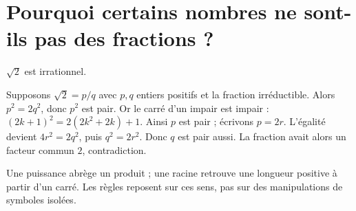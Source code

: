 \documentclass[../cours_3e.tex]{subfiles}
\begin{document}
\section{Pourquoi certains nombres ne sont-ils pas des fractions ?}
\approfondissement
\begin{theoreme}
$\sqrt2$ est irrationnel.
\end{theoreme}
\begin{demonstration}
Supposons $\sqrt2=p/q$ avec $p,q$ entiers positifs et la fraction irréductible. Alors $p^2=2q^2$, donc $p^2$ est pair. Or le carré d'un impair est impair : $(2k+1)^2=2(2k^2+2k)+1$. Ainsi $p$ est pair ; écrivons $p=2r$. L'égalité devient $4r^2=2q^2$, puis $q^2=2r^2$. Donc $q$ est pair aussi. La fraction avait alors un facteur commun $2$, contradiction.
\end{demonstration}
\begin{retenir}
Une puissance abrège un produit ; une racine retrouve une longueur positive à partir d'un carré. Les règles reposent sur ces sens, pas sur des manipulations de symboles isolées.
\end{retenir}
\end{document}
